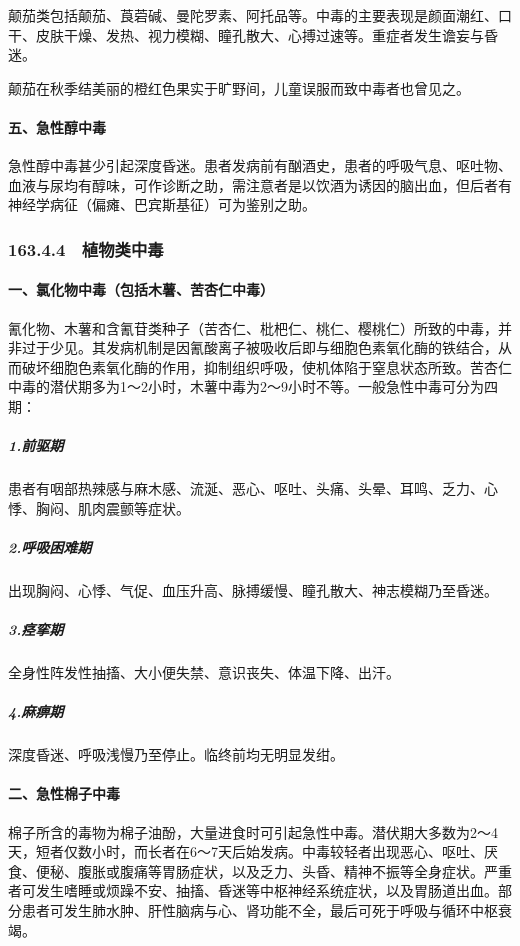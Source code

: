 颠茄类包括颠茄、莨菪碱、曼陀罗素、阿托品等。中毒的主要表现是颜面潮红、口干、皮肤干燥、发热、视力模糊、瞳孔散大、心搏过速等。重症者发生谵妄与昏迷。

颠茄在秋季结美丽的橙红色果实于旷野间，儿童误服而致中毒者也曾见之。

\paragraph{五、急性醇中毒}

急性醇中毒甚少引起深度昏迷。患者发病前有酗酒史，患者的呼吸气息、呕吐物、血液与尿均有醇味，可作诊断之助，需注意者是以饮酒为诱因的脑出血，但后者有神经学病征（偏瘫、巴宾斯基征）可为鉴别之助。

\subsubsection{163.4.4　植物类中毒}

\paragraph{一、氯化物中毒（包括木薯、苦杏仁中毒）}

氰化物、木薯和含氰苷类种子（苦杏仁、枇杷仁、桃仁、樱桃仁）所致的中毒，并非过于少见。其发病机制是因氰酸离子被吸收后即与细胞色素氧化酶的铁结合，从而破坏细胞色素氧化酶的作用，抑制组织呼吸，使机体陷于窒息状态所致。苦杏仁中毒的潜伏期多为1～2小时，木薯中毒为2～9小时不等。一般急性中毒可分为四期：

\subparagraph{1.前驱期}

患者有咽部热辣感与麻木感、流涎、恶心、呕吐、头痛、头晕、耳鸣、乏力、心悸、胸闷、肌肉震颤等症状。

\subparagraph{2.呼吸困难期}

出现胸闷、心悸、气促、血压升高、脉搏缓慢、瞳孔散大、神志模糊乃至昏迷。

\subparagraph{3.痉挛期}

全身性阵发性抽搐、大小便失禁、意识丧失、体温下降、出汗。

\subparagraph{4.麻痹期}

深度昏迷、呼吸浅慢乃至停止。临终前均无明显发绀。

\paragraph{二、急性棉子中毒}

棉子所含的毒物为棉子油酚，大量进食时可引起急性中毒。潜伏期大多数为2～4天，短者仅数小时，而长者在6～7天后始发病。中毒较轻者出现恶心、呕吐、厌食、便秘、腹胀或腹痛等胃肠症状，以及乏力、头昏、精神不振等全身症状。严重者可发生嗜睡或烦躁不安、抽搐、昏迷等中枢神经系统症状，以及胃肠道出血。部分患者可发生肺水肿、肝性脑病与心、肾功能不全，最后可死于呼吸与循环中枢衰竭。

